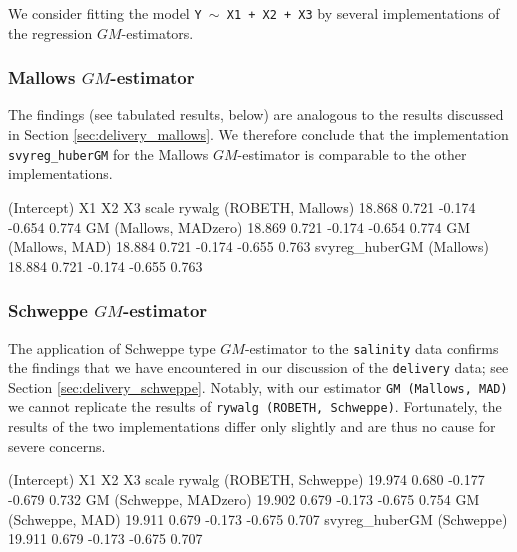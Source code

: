\documentclass[a4paper]{scrartcl}
\begin{document}
\noindent We consider fitting the model \texttt{Y $\sim$ X1 + X2 + X3} by several implementations of the regression $GM$-estimators. 



\subsubsection{Mallows $GM$-estimator}
The findings (see tabulated results, below) are analogous to the results discussed in Section \ref{sec:delivery_mallows}. We therefore conclude that the implementation \texttt{svyreg\_huberGM} for the Mallows $GM$-estimator is comparable to the other implementations.

\begin{Schunk}
\begin{Soutput}
                         (Intercept)    X1     X2     X3 scale
rywalg (ROBETH, Mallows)      18.868 0.721 -0.174 -0.654 0.774
GM (Mallows, MADzero)         18.869 0.721 -0.174 -0.654 0.774
GM (Mallows, MAD)             18.884 0.721 -0.174 -0.655 0.763
svyreg_huberGM (Mallows)      18.884 0.721 -0.174 -0.655 0.763
\end{Soutput}
\end{Schunk}

\subsubsection{Schweppe $GM$-estimator}
The application of Schweppe type $GM$-estimator to the \texttt{salinity} data confirms the findings that we have encountered in our discussion of the  \texttt{delivery} data; see Section \ref{sec:delivery_schweppe}. Notably, with our estimator \texttt{GM (Mallows, MAD)} we cannot replicate the results of \texttt{rywalg (ROBETH, Schweppe)}. Fortunately, the results of the two implementations differ only slightly and are thus no cause for severe concerns. 


\begin{Schunk}
\begin{Soutput}
                          (Intercept)    X1     X2     X3 scale
rywalg (ROBETH, Schweppe)      19.974 0.680 -0.177 -0.679 0.732
GM (Schweppe, MADzero)         19.902 0.679 -0.173 -0.675 0.754
GM (Schweppe, MAD)             19.911 0.679 -0.173 -0.675 0.707
svyreg_huberGM (Schweppe)      19.911 0.679 -0.173 -0.675 0.707
\end{Soutput}
\end{Schunk}


\end{document}
